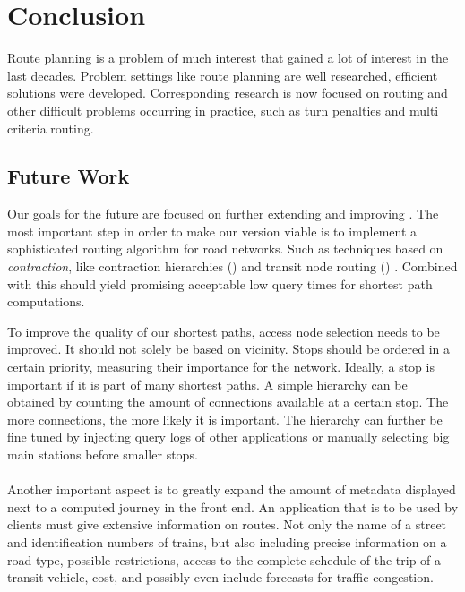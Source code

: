 \chapter{Conclusion}\label{conclusion}
	Route planning is a problem of much interest that gained a lot of interest in the last decades. Problem settings like \uniModal route planning are
	well researched, efficient solutions were developed. Corresponding research is now focused on \multiModal routing and other difficult problems
	occurring in practice, such as turn penalties and multi criteria routing.

\section{Future Work}
	Our goals for the future are focused on further extending and improving \cobweb. The most important step in order to make our \anr version
	viable is to implement a sophisticated routing algorithm for road networks. Such as techniques based on \textit{contraction}, like contraction
	hierarchies (\ch)  and transit node routing (\tnr) . Combined with \csa this should yield promising
	acceptable low query times for shortest path computations.
	
	To improve the quality of our shortest paths, access node selection needs to be improved. It should not solely be based on vicinity.
	Stops should be ordered in a certain priority, measuring their importance for the network. Ideally, a stop is important if it is part
	of many shortest paths. A simple hierarchy can be obtained by counting the amount of connections available at a certain stop.
	The more connections, the more likely it is important.
	The hierarchy can further be fine tuned by injecting query logs of other applications or manually selecting big main
	stations before smaller stops.\\\\
	Another important aspect is to greatly expand the amount of metadata displayed next to a computed journey in the front end.
	An application that is to be used by clients must give extensive information on routes. Not only the name of a street and identification numbers of
	trains, but also including precise information on a road type, possible restrictions, access to the complete schedule of the trip of a transit vehicle,
	cost, and possibly even include forecasts for traffic congestion.
	
